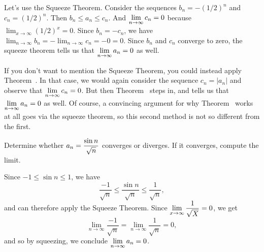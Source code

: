 
\begin{solution}
  Let's use the Squeeze Theorem.  Consider the sequences $b_n =
  -(1/2)^n$ and $c_n = (1/2)^n$.  Then $b_n \leq a_n \leq c_n$.  And
  $\displaystyle\lim_{n \to \infty} c_n = 0$ because $\lim_{x \to \infty}
  (1/2)^x = 0$.  Since $b_n = - c_n$, we have $\lim_{n \to \infty} b_n
  = - \lim_{n \to \infty} c_n = -0 = 0$.  Since $b_n$ and $c_n$
  converge to zero, the squeeze theorem tells us that $\displaystyle\lim_{n \to
    \infty} a_n = 0$ as well.

  If you don't want to mention the Squeeze Theorem, you could instead
  apply Theorem~.  In that case, we
  would again consider the sequence $c_n = |a_n|$ and observe that
  $\displaystyle\lim_{n \to \infty} c_n = 0$.  But then
  Theorem~ steps in, and tells us
  that $\displaystyle\lim_{n \to \infty} a_n = 0$ as well.  Of course, a
  convincing argument for why Theorem~ works at all goes via the squeeze theorem, so this
  second method is not so different from the first.
\end{solution}

\begin{example}
Determine whether $a_n = \displaystyle\frac{\sin n}{\sqrt{n}}$ converges or
diverges. If it converges, compute the limit. 
\end{example}

\begin{solution}
Since $-1 \leq \sin n \leq 1$, we have 
$$
\frac{-1}{\sqrt{n}} \leq \frac{\sin n}{\sqrt{n}} \leq \frac{1}{\sqrt{n}},
$$ 
and can therefore apply the Squeeze Theorem.  Since $\displaystyle\lim_{x \to \infty} \frac{1}{\sqrt{X}} = 0$, we get
$$
\lim_{n \to \infty} \frac{-1}{\sqrt{n}} = \lim_{n \to \infty} \frac{1}{\sqrt{n}} = 0,
$$
and so by squeezing, we conclude $\displaystyle\lim_{n \to \infty} a_n = 0$.
\end{solution}


